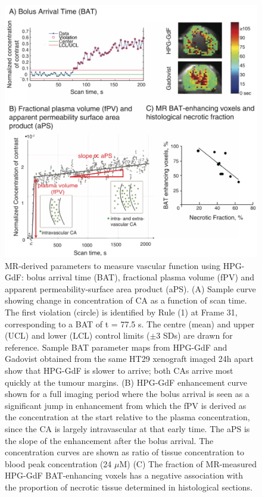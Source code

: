 \begin{figure}[htbp]
 \begin{center}
 \includegraphics[width=\textwidth]{hpg/hpg-paper1-images/hpg_fig2-bat.png}
 \caption{MR-derived parameters to measure vascular function using \acs{HPG-GdF}: bolus arrival time (BAT), fractional plasma volume (fPV) and apparent permeability-surface area product (aPS). (A) Sample curve showing change in concentration of \acs{CA} as a function of scan time. The first violation (circle) is identified by Rule (1) at Frame 31, corresponding to a \acs{BAT} of t = 77.5 s. The centre (mean) and upper (UCL) and lower (LCL) control limits ($\pm$3 SDs) are drawn for reference. Sample \acs{BAT} parameter maps from \acs{HPG-GdF} and Gadovist obtained from the same HT29 xenograft imaged 24h apart show that \acs{HPG-GdF} is slower to arrive; both \acs{CA}s arrive most quickly at the tumour margins. (B) \acs{HPG-GdF} enhancement curve shown for a full imaging period where the bolus arrival is seen as a significant jump in enhancement from which the \acs{fPV} is derived as the concentration at the start relative to the plasma concentration, since the \acs{CA} is largely intravascular at that early time. The \acs{aPS} is the slope of the enhancement after the bolus arrival. The concentration curves are shown as ratio of tissue concentration to blood peak concentration (24 $\mu$M) (C) The fraction of MR-measured \acs{HPG-GdF} \acs{BAT}-enhancing voxels has a negative association with the proportion of necrotic tissue determined in histological sections.}
 \label{hpgpaper1:fig2}
 \end{center}
\end{figure}

